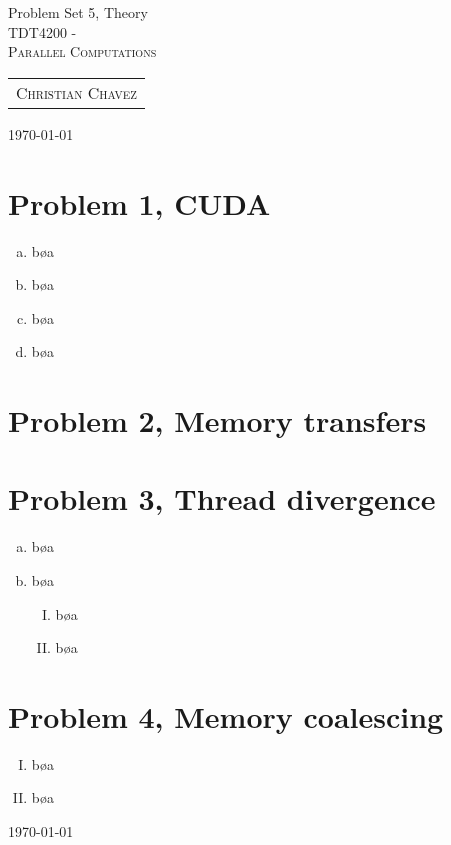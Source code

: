 \documentclass[fontsize=11pt, paper=a4, titlepage]{article}
\begin{document}
\begin{center}

{\huge Problem Set 5, Theory}\\[0.5cm]

\textsc{\LARGE TDT4200 -}\\[0.5cm]
\textsc{\large Parallel Computations}\\[1.0cm]

\begin{table}[h]
    \centering
    \begin{tabular}{c}
        \textsc{Christian Chavez}
    \end{tabular}
\end{table}

\end{center}
\vfill
\hfill \large{\today}
\clearpage

\section{Problem 1, CUDA}
\begin{enumerate}[a)]

    \item bøa

    \item bøa

    \item bøa

    \item bøa

\end{enumerate}

\section{Problem 2, Memory transfers}


\section{Problem 3, Thread divergence}
\begin{enumerate}[a)]

    \item bøa

    \item bøa

    \begin{enumerate}[I)]

        \item bøa

        \item bøa

    \end{enumerate}
\end{enumerate}

\section{Problem 4, Memory coalescing}
\begin{enumerate}[I)]

    \item bøa

    \item bøa

\end{enumerate}

\vfill
\hfill \large{\today}
\end{document}
